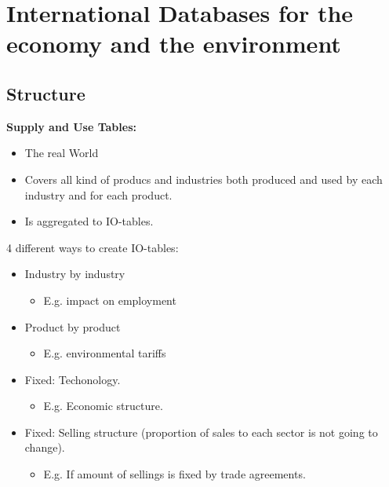 \section{International Databases for the economy and the environment} %
\begin{multicols}{2}
 \subsection{Structure}\noindent
 \textbf{Supply and Use Tables:}\\
 \begin{itemize}
  \item The real World
  \item Covers all kind of producs and industries both produced and used by each industry and for each product.
  \item Is aggregated to IO-tables.
 \end{itemize}
 4 different ways to create IO-tables:
 \begin{itemize}
  \item[1.] Industry by industry
        \begin{itemize}
         \item[$\rightarrow$] E.g. impact on employment
        \end{itemize}
  \item[2.] Product by product
        \begin{itemize}
         \item[$\rightarrow$] E.g. environmental tariffs
        \end{itemize}
  \item[3.] Fixed: Techonology.
        \begin{itemize}
         \item[$\rightarrow$] E.g. Economic structure.
        \end{itemize}
  \item[4.] Fixed: Selling structure (proportion of sales to each sector is not going to change).
        \begin{itemize}
         \item[$\rightarrow$] E.g. If amount of sellings is fixed by trade agreements.
        \end{itemize}
 \end{itemize}


\end{multicols}


